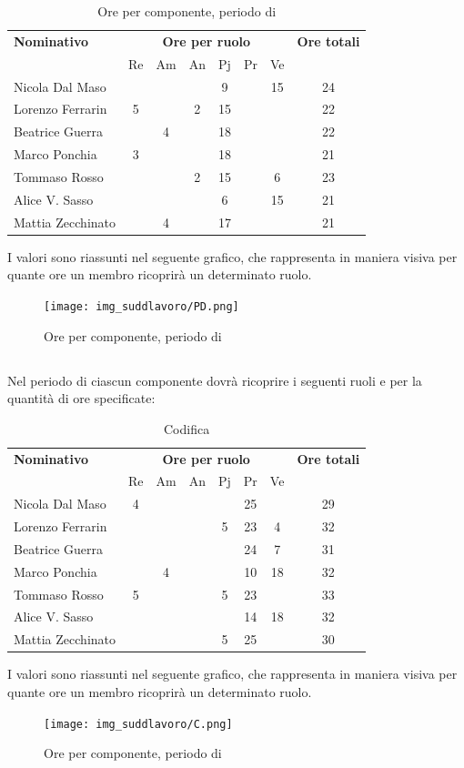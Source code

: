 \begin{table}[H]
	\centering
	\begin{tabular}{|l|c|c|c|c|c|c|c|}
		\hline
		\textbf{Nominativo} & 
		\multicolumn{6}{c|}{\textbf{Ore per ruolo}} & 
		\textbf{Ore totali} \\
		& Re & Am & An & Pj & Pr & Ve & \\
		\hline
		Nicola Dal Maso & & & &9 & &15 & 24 \\
		Lorenzo Ferrarin &5 & &2 &15 & & & 22 \\
		Beatrice Guerra & &4 & &18 & & & 22 \\
		Marco Ponchia &3 & & &18 & & & 21 \\
		Tommaso Rosso & & &2 &15 & &6 & 23 \\
		Alice V. Sasso & & & &6 & &15 & 21 \\
		Mattia Zecchinato & &4 & &17 & & & 21 \\
		\hline
	\end{tabular}
	\caption{Ore per componente, periodo di \PD{}}
\end{table}
I valori sono riassunti nel seguente grafico, che rappresenta in maniera visiva per quante ore un membro ricoprirà un determinato ruolo.
\begin{figure}[H]
	\centering
	\texttt{[image: img\_suddlavoro/PD.png]}
	\caption{Ore per componente, periodo di \PD{}}
\end{figure}

\subsection{\Cod}
Nel periodo di \Cod{} ciascun componente dovrà ricoprire i seguenti ruoli e per la quantità di ore specificate:

\begin{table}[H]
	\centering
	\begin{tabular}{|l|c|c|c|c|c|c|c|}
		\hline
		\textbf{Nominativo} & 
		\multicolumn{6}{c|}{\textbf{Ore per ruolo}} & 
		\textbf{Ore totali} \\
		& Re & Am & An & Pj & Pr & Ve & \\
		\hline
		Nicola Dal Maso &4 & & & &25 & & 29 \\
		Lorenzo Ferrarin & & & &5 &23 &4 & 32 \\
		Beatrice Guerra & & & & &24 &7 & 31 \\
		Marco Ponchia & &4 & & &10 &18 & 32 \\
		Tommaso Rosso &5 & & &5 &23 & & 33 \\
		Alice V. Sasso & & & & &14 &18 & 32 \\
		Mattia Zecchinato & & & &5 &25 & & 30 \\
		\hline
	\end{tabular}
	\caption{Codifica}
\end{table}
I valori sono riassunti nel seguente grafico, che rappresenta in maniera visiva per quante ore un membro ricoprirà un determinato ruolo.
\begin{figure}[H]
	\centering
	\texttt{[image: img\_suddlavoro/C.png]}
	\caption{Ore per componente, periodo di \Cod{}}
\end{figure}

